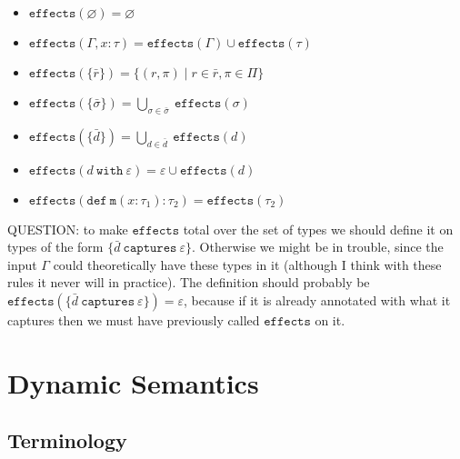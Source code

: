 \documentclass{llncs}
\newcommand{\keywadj}[1]{\mathtt{#1}}
\newcommand{\keyw}[1]{\keywadj{#1}~}
\begin{document}
\begin{itemize}
	\item $\keywadj{effects}(\varnothing) = \varnothing$
	\item $\keywadj{effects}(\Gamma, x : \tau) = \keywadj{effects}(\Gamma) \cup \keywadj{effects}(\tau)$
	\item $\keywadj{effects}(\{\bar r\}) = \{ (r, \pi) \mid r \in \bar r, \pi \in \Pi \}$
	\item $\keywadj{effects}(\{\bar \sigma\}) = \bigcup_{\sigma \in \bar \sigma}~\keywadj{effects}(\sigma)$
	\item $\keywadj{effects}(\{\bar d\}) = \bigcup_{d \in \bar d}~\keywadj{effects}(d)$
	\item $\keywadj{effects}(d~\keyw{with} \varepsilon) = \varepsilon \cup \keywadj{effects}(d)$
	\item $\keywadj{effects}(\keywadj{def~m}(x : \tau_1) : \tau_2) = \keywadj{effects}(\tau_2)$
\end{itemize}

\noindent
QUESTION: to make $\keywadj{effects}$ total over the set of types we should define it on types of the form $\{ \bar d~\keyw{captures} \varepsilon\}$. Otherwise we might be in trouble, since the input $\Gamma$ could theoretically have these types in it (although I think with these rules it never will in practice). The definition should probably be $\keywadj{effects}(\{ \bar d~\keyw{captures} \varepsilon\}) = \varepsilon$, because if it is already annotated with what it captures then we must have previously called $\keywadj{effects}$ on it.

\newpage


\section{Dynamic Semantics}

\subsection{Terminology}
\end{document}
